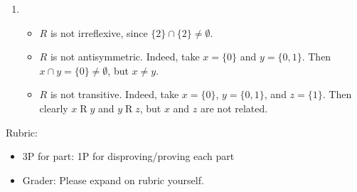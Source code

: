 \documentclass{article}
\theoremstyle{definition}
\begin{document}
\begin{solution}
\begin{enumerate}
	\item 
	\begin{itemize}
		\item $ R$ is not irreflexive, since $\{2\} \cap \{2\} \neq \emptyset$.
		\item $ R$ is not antisymmetric. Indeed, take $x = \{ 0 \}$ and $y = \{0,1\}$. Then $x \cap y = \{0 \} \neq \emptyset$, but $x \neq y$.
		\item $ R$ is not transitive. Indeed, take $x = \{ 0 \}$, $y = \{0,1\}$, and $z = \{1\}$. Then clearly $x \mathrel{R}y$ and $y \mathrel{R}z$, but $x$ and $z$ are not related.
	\end{itemize}
     \end{enumerate}
 {\color{red} Rubric:
\begin{itemize}
\item 3P for part: 1P for disproving/proving each part
\item Grader: Please expand on rubric yourself.
\end{itemize}}
\end{solution}
\end{document}
